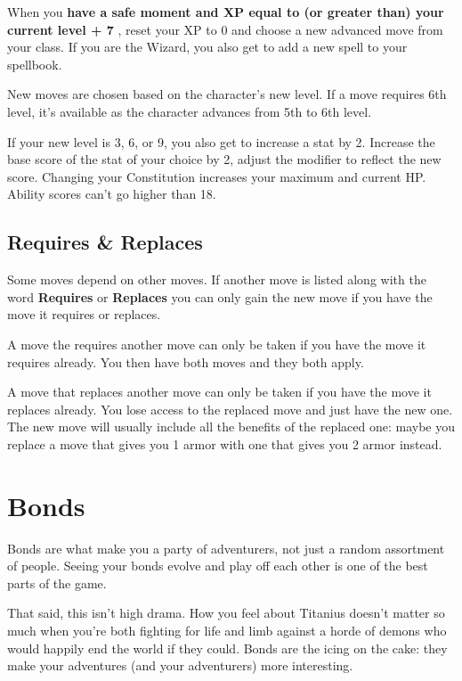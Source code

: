 When you {\bf have a safe moment and XP equal to (or greater than) your current level + 7} , reset your XP to 0 and choose a new advanced move from your class. If you are the Wizard, you also get to add a new spell to your spellbook.

 

New moves are chosen based on the character's new level. If a move requires 6th level, it's available as the character advances from 5th to 6th level.

 

If your new level is 3, 6, or 9, you also get to increase a stat by 2. Increase the base score of the stat of your choice by 2, adjust the modifier to reflect the new score. Changing your Constitution increases your maximum and current HP. Ability scores can't go higher than 18.

 
\subsection{Requires \& Replaces}    \index{\&} 
 

Some moves depend on other moves. If another move is listed along with the word {\bf Requires}  or {\bf Replaces}  you can only gain the new move if you have the move it requires or replaces.

 

A move the requires another move can only be taken if you have the move it requires already. You then have both moves and they both apply.

 

A move that replaces another move can only be taken if you have the move it replaces already. You lose access to the replaced move and just have the new one. The new move will usually include all the benefits of the replaced one: maybe you replace a move that gives you 1 armor with one that gives you 2 armor instead.

 
\section{Bonds}   
 

Bonds are what make you a party of adventurers, not just a random assortment of people. Seeing your bonds evolve and play off each other is one of the best parts of the game.

 

That said, this isn't high drama. How you feel about Titanius doesn't matter so much when you're both fighting for life and limb against a horde of demons who would happily end the world if they could. Bonds are the icing on the cake: they make your adventures (and your adventurers) more interesting.

